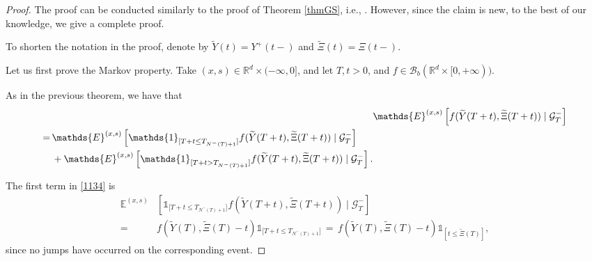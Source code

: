 \documentclass[reqno]{amsart}
\theoremstyle{remark}
\numberwithin{equation}{section} %
\newcommand{\RR}{\mathbb{R}}
\newcommand{\wt}{\widetilde}
\newcommand{\1}{\mathds{1}}
\begin{document}
	\begin{proof}
		The proof can be conducted similarly to the proof of Theorem \ref{thmGS}, i.e., \cite[Lemma 2, Section 3, Chapter 3]{Gihman}. However, since the claim is new, to the best of our knowledge, we give a complete proof.
		
		To shorten the notation in the proof, denote by $\wt Y(t)= Y^+(t-)$ and $\wt \Xi(t)=\Xi(t-)$.
		
		Let us first prove the Markov property. Take $(x,s)\in \RR^d\times (-\infty,0]$, and let $T,t>0$, and $f \in \mathcal{B}_b (\mathbb{R}^d \times [0, +\infty))$.
		
		As in the previous theorem, we have that
		\begin{align}
			& \mathds{E}^{(x,s)} \left[  f (\widetilde{Y}(T+t), \widetilde{\Xi}(T+t)) \mid \mathcal{G}^-_T \right] \notag \\
			\begin{split}\label{1134}
				= \, &\mathds{E}^{(x,s)} \left[ \mathds{1}_{[{T+t\leq T_{N^-(T)+1}]}} f (\widetilde{Y}(T+t), \widetilde{\Xi}(T+t)) \mid \mathcal{G}^-_T \right]\\ &+\mathds{E}^{(x,s)} \left[ \mathds{1}_{{[T+t> T_{N^-(T)+1}]}} f (\widetilde{Y}(T+t), \widetilde{\Xi}(T+t)) \mid \mathcal{G}^-_T \right] .
			\end{split}
		\end{align}
		
		The first term in \eqref{1134} is
		\begin{align}
			\mathds{E}^{(x,s)} &\left[ \mathds{1}_{[{T+t\leq T_{N^-(T)+1}]}} f (\widetilde{Y}(T+t), \widetilde{\Xi}(T+t)) \mid \mathcal{G}^-_T \right]\\
			= \, &f (\widetilde{Y}(T), \widetilde{\Xi}(T)-t)\mathds{1}_{[{T+t\leq T_{N^-(T)+1}]}}\, = \, f (\widetilde{Y}(T), \widetilde{\Xi}(T)-t)\mathds{1}_{[t\leq \widetilde{\Xi}(T)]},
		\end{align}
		since no jumps have occurred on the corresponding event.
		

\end{proof}
\end{document}
